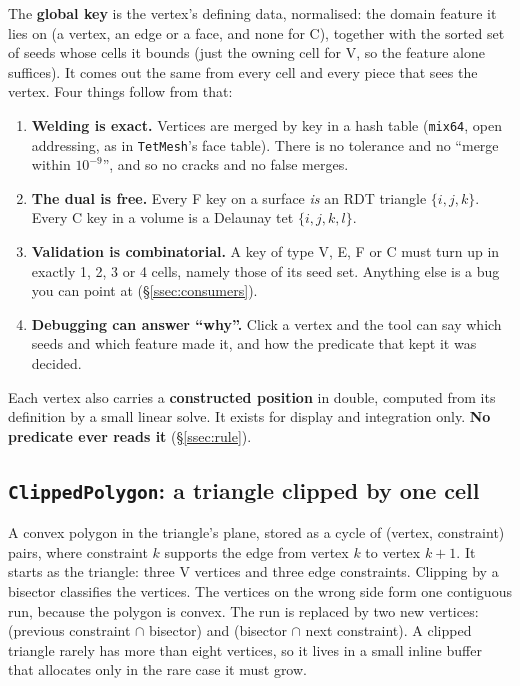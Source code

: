 \documentclass[11pt,a4paper]{article}
\newcommand{\code}[1]{\texttt{#1}}          %
\newcommand{\secref}[1]{\S\ref{#1}}
\begin{document}
The \textbf{global key} is the vertex's defining data, normalised: the domain feature it lies on
(a vertex, an edge or a face, and none for C), together with the sorted set of seeds whose
cells it bounds (just the owning cell for V, so the feature alone suffices). It comes out the
same from every cell and every piece that sees the vertex. Four things follow from that:

\begin{enumerate}
\item \textbf{Welding is exact.} Vertices are merged by key in a hash table (\code{mix64}, open
  addressing, as in \code{TetMesh}'s face table). There is no tolerance and no ``merge within
  $10^{-9}$'', and so no cracks and no false merges.
\item \textbf{The dual is free.} Every F key on a surface \emph{is} an RDT triangle
  $\{i,j,k\}$. Every C key in a volume is a Delaunay tet $\{i,j,k,l\}$.
\item \textbf{Validation is combinatorial.} A key of type V, E, F or C must turn up in exactly 1,
  2, 3 or 4 cells, namely those of its seed set. Anything else is a bug you can point at
  (\secref{ssec:consumers}).
\item \textbf{Debugging can answer ``why''.} Click a vertex and the tool can say which seeds and
  which feature made it, and how the predicate that kept it was decided.
\end{enumerate}

Each vertex also carries a \textbf{constructed position} in double, computed from its definition
by a small linear solve. It exists for display and integration only. \textbf{No predicate ever
reads it} (\secref{ssec:rule}).

\subsection{\texorpdfstring{\code{ClippedPolygon}}{ClippedPolygon}: a triangle clipped by one cell}\label{ssec:polygon}

A convex polygon in the triangle's plane, stored as a cycle of (vertex, constraint) pairs, where
constraint $k$ supports the edge from vertex $k$ to vertex $k+1$. It starts as the triangle:
three V vertices and three edge constraints. Clipping by a bisector classifies the vertices. The
vertices on the wrong side form one contiguous run, because the polygon is convex. The run is
replaced by two new vertices: (previous constraint $\cap$ bisector) and (bisector $\cap$ next
constraint). A clipped triangle rarely has more than eight vertices, so it lives in a small
inline buffer that allocates only in the rare case it must grow.
\end{document}

